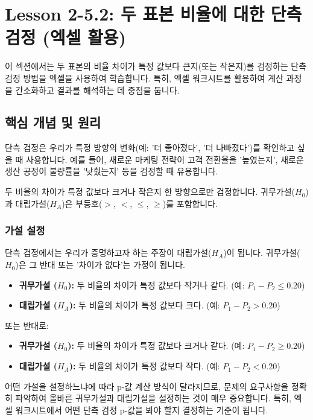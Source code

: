 \documentclass[11pt,a4paper]{book}
\theoremstyle{definition}
\begin{document}
\section{Lesson 2-5.2: 두 표본 비율에 대한 단측 검정 (엑셀 활용)}

이 섹션에서는 두 표본의 비율 차이가 특정 값보다 큰지(또는 작은지)를 검정하는 단측 검정 방법을 엑셀을 사용하여 학습합니다. 특히, 엑셀 워크시트를 활용하여 계산 과정을 간소화하고 결과를 해석하는 데 중점을 둡니다.

\subsection{핵심 개념 및 원리}

단측 검정은 우리가 특정 방향의 변화(예: '더 좋아졌다', '더 나빠졌다')를 확인하고 싶을 때 사용합니다. 예를 들어, 새로운 마케팅 전략이 고객 전환율을 '높였는지', 새로운 생산 공정이 불량률을 '낮췄는지' 등을 검정할 때 유용합니다.

\begin{summarybox}[title=단측 검정의 핵심:]
두 비율의 차이가 특정 값보다 크거나 작은지 한 방향으로만 검정합니다.
귀무가설($H_0$)과 대립가설($H_A$)은 부등호($>$, $<$, $\le$, $\ge$)를 포함합니다.
\end{summarybox}

\subsubsection{가설 설정}
단측 검정에서는 우리가 증명하고자 하는 주장이 대립가설($H_A$)이 됩니다. 귀무가설($H_0$)은 그 반대 또는 '차이가 없다'는 가정이 됩니다.

\begin{itemize}
    \item \textbf{귀무가설 ($H_0$):} 두 비율의 차이가 특정 값보다 작거나 같다. (예: $P_1 - P_2 \le 0.20$)
    \item \textbf{대립가설 ($H_A$):} 두 비율의 차이가 특정 값보다 크다. (예: $P_1 - P_2 > 0.20$)
\end{itemize}
또는 반대로:
\begin{itemize}
    \item \textbf{귀무가설 ($H_0$):} 두 비율의 차이가 특정 값보다 크거나 같다. (예: $P_1 - P_2 \ge 0.20$)
    \item \textbf{대립가설 ($H_A$):} 두 비율의 차이가 특정 값보다 작다. (예: $P_1 - P_2 < 0.20$)
\end{itemize}

\begin{cautionbox}[title=가설 설정 시 주의사항:]
어떤 가설을 설정하느냐에 따라 p-값 계산 방식이 달라지므로, 문제의 요구사항을 정확히 파악하여 올바른 귀무가설과 대립가설을 설정하는 것이 매우 중요합니다. 특히, 엑셀 워크시트에서 어떤 단측 검정 p-값을 봐야 할지 결정하는 기준이 됩니다.
\end{cautionbox}
\end{document}
